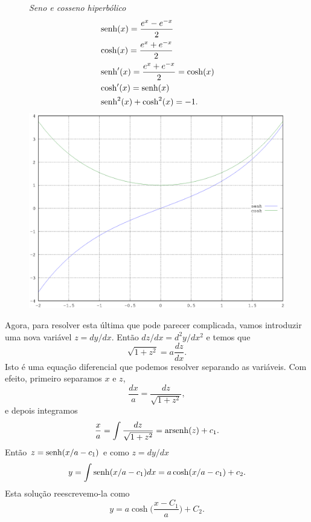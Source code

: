 \begin{figure}
  \begin{mybox}
    \centering
    \emph{\textcolor{bluesol}{Seno e cosseno hiperbólico}}
    \begin{align*}
      &\operatorname{senh}(x)=\frac{e^x-e^{-x}}{2}\\
      &\cosh(x)=\frac{e^x+e^{-x}}{2}\\
      &\operatorname{senh}'(x)=\frac{e^x+e^{-x}}{2}=\cosh(x)\\
      &\cosh'(x)=\operatorname{senh}(x)\\
      &\operatorname{senh}^2(x)+\cosh^2(x)=-1.
    \end{align*}
    \includegraphics[width=\columnwidth]{shch}
  \end{mybox}
  \vspace{1cm}
\end{figure}

Agora, para resolver esta última que pode parecer complicada, vamos
introduzir uma nova variável $z=dy/dx$. Então $dz/dx={d^2y}/{dx^2}$ e
temos que
\begin{displaymath}
  \sqrt{1+z^2}=a\frac{dz}{dx}.
\end{displaymath}
Isto é uma equação diferencial que podemos resolver separando as
variáveis. Com efeito, primeiro separamos $x$ e $z$,
\begin{displaymath}
  \frac{dx}{a}=\frac{dz}{\sqrt{1+z^2}},
\end{displaymath}
e depois integramos
\begin{displaymath}
  \frac{x}{a}=\int\frac{dz}{\sqrt{1+z^2}}=\operatorname{arsenh}(z)+c_1.
\end{displaymath}
Então $z=\operatorname{senh}(x/a-c_1)$ e como $z=dy/dx$
\begin{displaymath}
  y=\int \operatorname{senh}(x/a-c_1) dx = a\cosh(x/a-c_1) + c_2.
\end{displaymath}
Esta solução reescrevemo-la como
\begin{equation}
    \label{eq:5}
    \boxed{y= a\cosh\Big(\frac{x-C_1}{a}\Big) + C_2.}
\end{equation}


